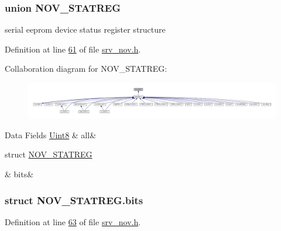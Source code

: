 \subsubsection{union N\+O\+V\+\_\+\+S\+T\+A\+T\+R\+E\+G}
serial eeprom device status register structure 

Definition at line \hyperlink{a00029_source_l00061}{61} of file \hyperlink{a00029_source}{srv\+\_\+nov.\+h}.



Collaboration diagram for N\+O\+V\+\_\+\+S\+T\+A\+T\+R\+E\+G\+:\nopagebreak
\begin{figure}[H]
\begin{center}
\leavevmode
\includegraphics[width=350pt]{d7/db8/a01687}
\end{center}
\end{figure}
\begin{DoxyFields}{Data Fields}
\hypertarget{a00029_a2625a533c46821f49caaf4dcc77316b1}{\hyperlink{a00072_af84840501dec18061d18a68c162a8fa2}{Uint8}}\label{a00029_a2625a533c46821f49caaf4dcc77316b1}
&
all&
\\
\hline

\hypertarget{a00029_ac9b2947d4b71b2832d30405c0a8d7f6f}{struct \hyperlink{a00029_d8/d00/a00606}{N\+O\+V\+\_\+\+S\+T\+A\+T\+R\+E\+G}}\label{a00029_ac9b2947d4b71b2832d30405c0a8d7f6f}
&
bits&
\\
\hline

\end{DoxyFields}
\label{d8/d00/a00606}
\hypertarget{a00029_d8/d00/a00606}{}
\subsubsection{struct N\+O\+V\+\_\+\+S\+T\+A\+T\+R\+E\+G.\+bits}


Definition at line \hyperlink{a00029_source_l00063}{63} of file \hyperlink{a00029_source}{srv\+\_\+nov.\+h}.



